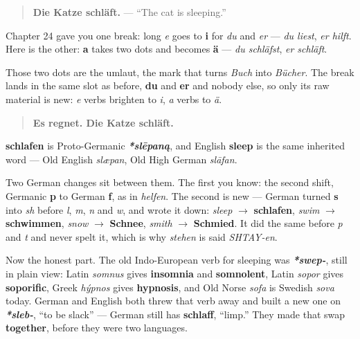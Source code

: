 \begin{quote}
\textbf{Die Katze schläft.} — \textquotedblleft{}The cat is sleeping.\textquotedblright{}
\end{quote}

\begin{grammarlens}[title={Grammar Lens: the second kind of break}]
Chapter 24 gave you one break: long \emph{e} goes to \textbf{i} for \emph{du} and \emph{er} — \emph{du liest}, \emph{er hilft}. Here is the other: \textbf{a} takes two dots and becomes \textbf{ä} — \emph{du schläfst}, \emph{er schläft}.

Those two dots are the umlaut, the mark that turns \emph{Buch} into \emph{Bücher}. The break lands in the same slot as before, \textbf{du} and \textbf{er} and nobody else, so only its raw material is new: \emph{e} verbs brighten to \emph{i}, \emph{a} verbs to \emph{ä}.

\begin{quote}
\textbf{Es regnet. Die Katze schläft.}
\end{quote}
\end{grammarlens}

\begin{cousinweb}
\textbf{schlafen} is Proto-Germanic \emph{\textbf{*slēpaną}}, and English \textbf{sleep} is the same inherited word — Old English \emph{slæpan}, Old High German \emph{slāfan}.

Two German changes sit between them. The first you know: the second shift, Germanic \textbf{p} to German \textbf{f}, as in \emph{helfen}. The second is new — German turned \textbf{s} into \emph{sh} before \emph{l}, \emph{m}, \emph{n} and \emph{w}, and wrote it down: \emph{sleep} $\to$ \textbf{schlafen}, \emph{swim} $\to$ \textbf{schwimmen}, \emph{snow} $\to$ \textbf{Schnee}, \emph{smith} $\to$ \textbf{Schmied}. It did the same before \emph{p} and \emph{t} and never spelt it, which is why \emph{stehen} is said \emph{SHTAY-en}.

Now the honest part. The old Indo-European verb for sleeping was \emph{\textbf{*swep-}}, still in plain view: Latin \emph{somnus} gives \textbf{insomnia} and \textbf{somnolent}, Latin \emph{sopor} gives \textbf{soporific}, Greek \emph{hýpnos} gives \textbf{hypnosis}, and Old Norse \emph{sofa} is Swedish \emph{sova} today. German and English both threw that verb away and built a new one on \emph{\textbf{*sleb-}}, \textquotedblleft{}to be slack\textquotedblright{} — German still has \textbf{schlaff}, \textquotedblleft{}limp.\textquotedblright{} They made that swap \textbf{together}, before they were two languages.
\end{cousinweb}

